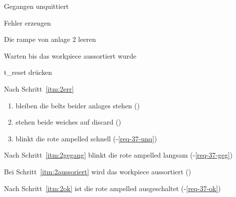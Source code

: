 \begin{ablauf}{Gegangen unquittiert}
    \item \label{itm:2err} Fehler erzeugen
    \item\label{itm:2gegang} Die \gls{rampe} von \gls{anlage} 2 leeren
    \item\label{itm:2aussoriert} Warten bis das \gls{workpiece} aussortiert wurde
    \item\label{itm:2ok} \gls{t_reset} drücken
\end{ablauf}
\begin{erwartung}
    \item Nach Schritt~\ref{itm:2err}
    \begin{enumerate}
        \item bleiben die \glspl{belt} beider \glspl{anlage} stehen ()
        \item stehen beide \glspl{weiche} auf \gls{discard} ()
        \item blinkt die rote \gls{ampelled} schnell (-\ref{req-37-unq})
    \end{enumerate}
    \item Nach Schritt~\ref{itm:2gegang} blinkt die rote \gls{ampelled} langsam (-\ref{req-37-geg})
    \item Bei Schritt~\ref{itm:2aussoriert} wird das \gls{workpiece} aussortiert ()
    \item Nach Schritt~\ref{itm:2ok} ist die rote \gls{ampelled} ausgeschaltet (-\ref{req-37-ok})
\end{erwartung}

